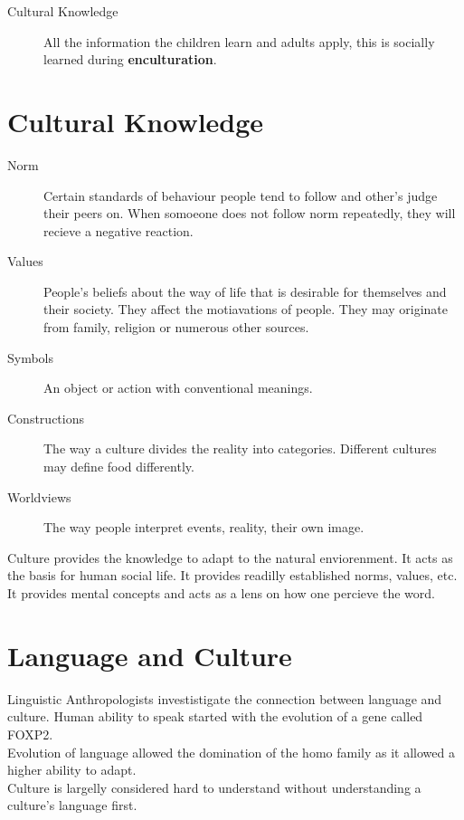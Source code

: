 \documentclass[11pt,a4paper]{book}
\begin{document}
\begin{description}
\item[Cultural Knowledge] All the information the children learn and adults apply, this is socially learned during \textbf{enculturation}.
\end{description}

\section{Cultural Knowledge}

\begin{description}
\item[Norm] Certain standards of behaviour people tend to follow and other's judge their peers on. When somoeone does not follow norm repeatedly, they will recieve a negative reaction.
\item[Values] People's beliefs about the way of life that is desirable for themselves and their society. They affect the motiavations of people. They may originate from family, religion or numerous other sources.
\item[Symbols] An object or action with conventional meanings.
\item[Constructions] The way a culture divides the reality into categories. Different cultures may define food differently.
\item[Worldviews] The way people interpret events, reality, their own image.
\end{description}

Culture provides the knowledge to adapt to the natural enviorenment. It acts as the basis for human social life. It provides readilly established norms, values, etc. It provides mental concepts and acts as a lens on how one percieve the word.\\

\section{Language and Culture}

Linguistic Anthropologists investistigate the connection between language and culture. Human ability to speak started with the evolution of a gene called FOXP2.\\

Evolution of language allowed the domination of the homo family as it allowed a higher ability to adapt.\\

Culture is largelly considered hard to understand without understanding a culture's language first.\\
\end{document}
